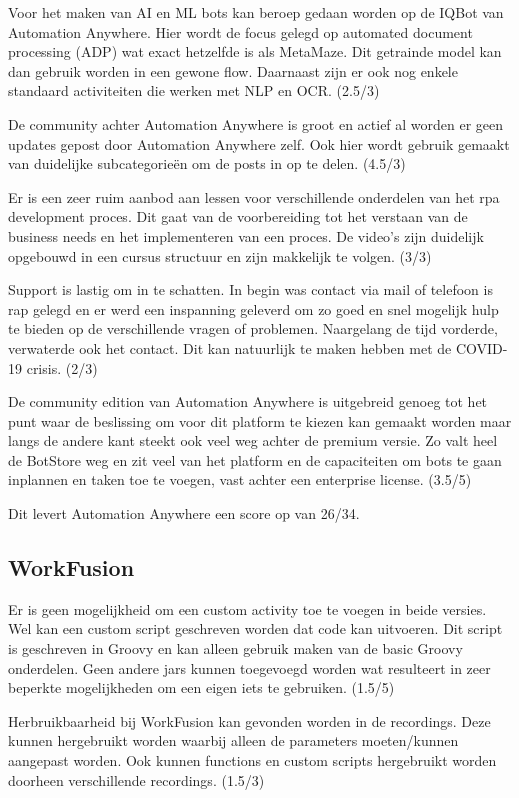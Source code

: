 Voor het maken van AI en ML bots kan beroep gedaan worden op de IQBot van Automation Anywhere. Hier wordt de focus gelegd op automated document processing (ADP) wat exact hetzelfde is als MetaMaze. Dit getrainde model kan dan gebruik worden in een gewone flow. Daarnaast zijn er ook nog enkele standaard activiteiten die werken met NLP en OCR. (2.5/3)

De community achter Automation Anywhere is groot en actief al worden er geen updates gepost door Automation Anywhere zelf. Ook hier wordt gebruik gemaakt van duidelijke subcategorieën om de posts in op te delen. (4.5/3) 

Er is een zeer ruim aanbod aan lessen voor verschillende onderdelen van het \acrshort{rpa} development proces. Dit gaat van de voorbereiding tot het verstaan van de business needs en het implementeren van een proces. De video's zijn duidelijk opgebouwd in een cursus structuur en zijn makkelijk te volgen. (3/3)

Support is lastig om in te schatten. In begin was contact via mail of telefoon is rap gelegd en er werd een inspanning geleverd om zo goed en snel mogelijk hulp te bieden op de verschillende vragen of problemen. Naargelang de tijd vorderde, verwaterde ook het contact. Dit kan natuurlijk te maken hebben met de COVID-19 crisis. (2/3)

De community edition van Automation Anywhere is uitgebreid genoeg tot het punt waar de beslissing om voor dit platform te kiezen kan gemaakt worden maar langs de andere kant steekt ook veel weg achter de premium versie. Zo valt heel de BotStore weg en zit veel van het platform en de capaciteiten om bots te gaan inplannen en taken toe te voegen, vast achter een enterprise license. (3.5/5)

Dit levert Automation Anywhere een score op van 26/34.

\subsection{WorkFusion}

Er is geen mogelijkheid om een custom activity toe te voegen in beide versies. Wel kan een custom script geschreven worden dat code kan uitvoeren. Dit script is geschreven in Groovy en kan alleen gebruik maken van de basic Groovy onderdelen. Geen andere jars kunnen toegevoegd worden wat resulteert in zeer beperkte mogelijkheden om een eigen iets te gebruiken. (1.5/5)

Herbruikbaarheid bij WorkFusion kan gevonden worden in de recordings. Deze kunnen hergebruikt worden waarbij alleen de parameters moeten/kunnen aangepast worden. Ook kunnen functions en custom scripts hergebruikt worden doorheen verschillende recordings. (1.5/3)

